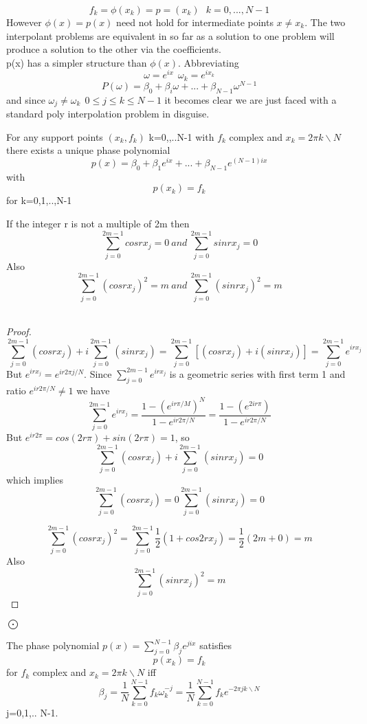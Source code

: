 \[
f_k=\phi(x_k)=p=(x_k) \ \ \ k =0,...,N-1
\]
However $\phi(x)=p(x)$ need not hold for intermediate points $x\not=x_k$.  The
two interpolant problems are equivalent in so far as a solution to one problem will
produce a solution to the other via the coefficients.\\
p(x) has a simpler structure than $\phi(x)$.
Abbreviating
\[ \omega = e^{ix} \ \ \omega_k=e^{ix_k}\]
\[P(\omega) = \beta_0+\beta_i \omega +...+\beta_{N-1}\omega^{N-1} \]
and since $\omega_j \not= \omega_k \ \ 0\leq j \leq k\leq N-1$ it becomes clear we 
are just faced with a standard poly interpolation problem in disguise.\\
\begin{theorem}
For any support points $(x_{k},f_{k})$ k=0,,..N-1 with $f_k$ complex and $x_k = 2\pi k\backslash N$ there
exists a unique phase polynomial
\[ p(x) = \beta_0 + \beta_1 e^{ix} +...+ \beta_{N-1} e^{(N-1)ix} \]
with
\[ p(x_k)=f_k \]
for k=0,1,..,N-1\\
\end{theorem}
\begin{theorem}
If the integer r is not a multiple of 2m then
\[
\sum_{j=0}^{2m-1} cosrx_j =0 \ and \ 
\sum_{j=0}^{2m-1} sinrx_j =0 
\]
Also
\[
\sum_{j=0}^{2m-1} (cosrx_j)^2 =m \ and \ 
\sum_{j=0}^{2m-1} (sinrx_j)^2 =m 
\]
\\
\end{theorem}
\begin{proof}
\[
\sum_{j=0}^{2m-1} (cosrx_j) +
i\sum_{j=0}^{2m-1} (sinrx_j) =
\sum_{j=0}^{2m-1} [(cosrx_j) +i(sinrx_j)] =
\sum_{j=0}^{2m-1}e^{irx_j} 
\]
But $e^{irx_j}=e^{ir2\pi j/N}$. Since 
$\sum_{j=0}^{2m-1}e^{irx_j} $ is a geometric series with first term 1 and ratio
$e^{ir2\pi/N}\not=1$ we have 
\[ \sum_{j=0}^{2m-1}e^{irx_j} =\frac{1-(e^{ir\pi/M})^{N}}{1-e^{ir2\pi/N}}
 =\frac{1-(e^{2ir\pi})}{1-e^{ir2\pi/N}}
 \]
But $e^{ir2\pi}=cos(2r\pi)+sin(2r\pi)=1$, so
\[
\sum_{j=0}^{2m-1} (cosrx_j) +
i\sum_{j=0}^{2m-1} (sinrx_j) = 0 \]
which implies
\[
\sum_{j=0}^{2m-1} (cosrx_j) =0
\sum_{j=0}^{2m-1} (sinrx_j) = 0 \]

\[
\sum_{j=0}^{2m-1} (cosrx_j)^2 =
\sum_{j=0}^{2m-1} \frac{1}{2}(1+cos2rx_j) =\frac{1}{2}(2m+0)=m
\]
Also
\[
\sum_{j=0}^{2m-1} (sinrx_j)^2 =m
\]
\end{proof}$\bigodot$
\begin{theorem}
The phase polynomial $p(x) = \sum_{j=0}^{N-1} \beta_j e^{jix}$ satisfies 
\[ p(x_k)=f_k \]
for $f_k$ complex and $x_k = 2\pi k \backslash N$ iff
\[
\beta_j = \frac{1}{N} \sum_{k=0}^{N-1} f_k \omega^{-j}_k = \frac{1}{N} \sum_{k=0}^{N-1} f_k e^{-2 \pi jk\backslash N}
\]
j=0,1,.. N-1.
\\
\end{theorem}


